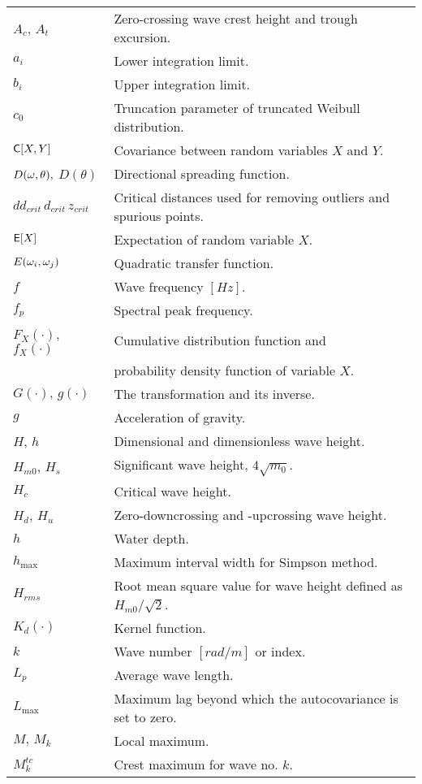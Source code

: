 \smallskip
\begin{tabular}{p{23mm}p{125mm}}
  $A_{c}$, $A_{t}$            & Zero-crossing wave crest height and
  trough excursion. \\
  $a_{i}$ & Lower integration limit.\\
  $b_{i}$ & Upper integration limit. \\

$c_{0}$ & Truncation parameter of truncated Weibull distribution.\\
  $\mbox{\sf C} [X,Y]$                  & Covariance between random variables
  $X$ and $Y$. \\
  $D(\omega ,\theta),$ $D(\theta)$ & Directional spreading function.\\
  $dd_{crit}\, d_{crit}\, %
  z_{crit}$                  & Critical distances used for removing
  outliers and spurious points. \\
 $\mbox{\sf E} [X]$                      & Expectation of random variable $X$.\\
 $E(\omega _{i},\omega _{j})$ & Quadratic transfer function.\\
  $f$                         & Wave frequency $[\textit{Hz}]$.\\
  $f_{p}$                     & Spectral peak frequency. \\
  $F_{X}(\cdot)$, %
  $f_{X}(\cdot)$              & Cumulative distribution function and \\%
                              &  probability density function of
                                 variable $X$. \\

  $G(\cdot),\,g(\cdot)$ & The transformation and its inverse.\\
  $g$ & Acceleration of gravity.\\
  $H$, $h$                    & Dimensional and dimensionless wave height. \\
  $H_{m0}$, $H_s$             & Significant wave height,  $4\sqrt{m_{0}}$.\\
 $H_{c}$    & Critical wave height. \\
  $H_{d}$,  $H_{u}$           & Zero-downcrossing and -upcrossing
  wave height. \\
 $h$ & Water depth.\\
 $h_{\max}$ & Maximum interval width for Simpson method.\\
  $H_{rms}$                      & Root mean square value for wave
  height defined as $H_{m0}/\sqrt{2}$.\\
 $K_{d}(\cdot)$  & Kernel function. \\
 $k$    & Wave number $[\textit{rad/m}]$ or index.\\
 $L_{p}$        & Average wave length.\\
 $L_{\max}$ & Maximum lag beyond which the autocovariance is set to zero.\\
 $M,\,M_{k}$    & Local maximum. \\
 $M_{k}^{tc}$   & Crest maximum for wave no. $k$.
\end{tabular}

